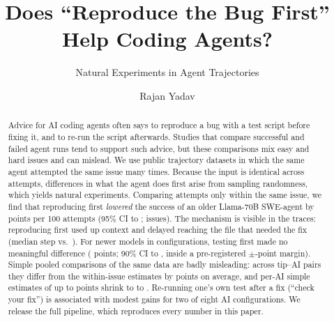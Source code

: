 \documentclass[sigconf,review=false,anonymous=false]{acmart}
\begin{document}
\title{Does ``Reproduce the Bug First'' Help Coding Agents?}
\subtitle{Natural Experiments in \TriesAnalysed{} Agent Trajectories}

\author{Rajan Yadav}

\begin{abstract}
Advice for AI coding agents often says to reproduce a bug with a test script before fixing it, and to re-run the script afterwards. Studies that compare successful and failed agent runs tend to support such advice, but these comparisons mix easy and hard issues and can mislead. We use public trajectory datasets in which the same agent attempted the same issue many times. Because the input is identical across attempts, differences in what the agent does first arise from sampling randomness, which yields natural experiments. Comparing attempts only within the same issue, we find that reproducing first \emph{lowered} the success of an older Llama-70B SWE-agent by \POneAbs{} points per 100 attempts (95\% CI \POneLo{} to \POneHi{}; \POneIssues{} issues). The mechanism is visible in the traces: reproducing first used up context and delayed reaching the file that needed the fix (median step \KMMedianR{} vs.\ \KMMedianS{}). For \NumNewerModels{} newer models in \NumNewerConfigs{} configurations, testing first made no meaningful difference (\PTwoEst{} points; 90\% CI \PTwoLoNinety{} to \PTwoHiNinety{}, inside a pre-registered $\pm$\Margin{}-point margin). Simple pooled comparisons of the same data are badly misleading: across \PThreePairs{} tip--AI pairs they differ from the within-issue estimates by \PThreeGap{} points on average, and per-AI simple estimates of up to \PerAISimpleMax{} points shrink to \PerAIFairMin{} to \PerAIFairMax{}. Re-running one's own test after a fix (``check your fix'') is associated with modest gains for two of eight AI configurations. We release the full pipeline, which reproduces every number in this paper.
\end{abstract}



\maketitle
\end{document}
